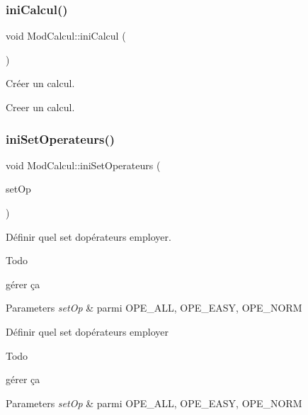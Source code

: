 \subsubsection{\texorpdfstring{ini\+Calcul()}{iniCalcul()}}
{\footnotesize\ttfamily void Mod\+Calcul\+::ini\+Calcul (\begin{DoxyParamCaption}\item[{void}]{ }\end{DoxyParamCaption})}



Créer un calcul. 

Creer un calcul. \mbox{\label{class_mod_calcul_ad6061decce032f0debf6fa79d153df5d}} 
\subsubsection{\texorpdfstring{ini\+Set\+Operateurs()}{iniSetOperateurs()}}
{\footnotesize\ttfamily void Mod\+Calcul\+::ini\+Set\+Operateurs (\begin{DoxyParamCaption}\item[{\hyperlink{class_mod_calcul_a6c7aa1fa9a9cf577567da286e26596ce}{pos\+Set\+Op}}]{set\+Op }\end{DoxyParamCaption})}



Définir quel set d\textquotesingle{}opérateurs employer. 

\begin{DoxyRefDesc}{Todo}
\item[\hyperlink{todo__todo000008}{Todo}]gérer ça \end{DoxyRefDesc}

\begin{DoxyParams}{Parameters}
{\em set\+Op} & parmi O\+P\+E\+\_\+\+A\+LL, O\+P\+E\+\_\+\+E\+A\+SY, O\+P\+E\+\_\+\+N\+O\+RM\\
\hline
\end{DoxyParams}
Définir quel set d\textquotesingle{}opérateurs employer \begin{DoxyRefDesc}{Todo}
\item[\hyperlink{todo__todo000007}{Todo}]gérer ça \end{DoxyRefDesc}

\begin{DoxyParams}{Parameters}
{\em set\+Op} & parmi O\+P\+E\+\_\+\+A\+LL, O\+P\+E\+\_\+\+E\+A\+SY, O\+P\+E\+\_\+\+N\+O\+RM \\
\hline
\end{DoxyParams}
\mbox{\label{class_mod_calcul_ab2fe81565c7084fa2c4344fce053eb14}} 
